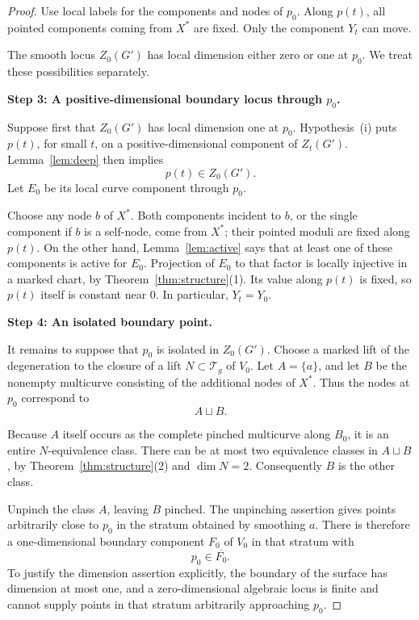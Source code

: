 \documentclass[11pt]{article}
\newcommand{\T}{\mathcal T}
\newcommand{\ol}[1]{\overline{#1}}
\theoremstyle{remark}
\begin{document}
\begin{proof}
Use local labels for the components and nodes of \(p_0\).
Along \(p(t)\), all pointed components coming from \(X^\ast\)
are fixed. Only the component \(Y_t\) can move.

The smooth locus \(Z_0(G')\) has local dimension either zero
or one at \(p_0\). We treat these possibilities separately.


\medskip
\noindent\textbf{Step 3: A positive-dimensional boundary locus
through \(p_0\).}

Suppose first that \(Z_0(G')\) has local dimension one at
\(p_0\). Hypothesis~(i) puts \(p(t)\), for small \(t\), on a
positive-dimensional component of \(Z_t(G')\).
Lemma~\ref{lem:deep} then implies
\[
p(t)\in Z_0(G').
\]
Let \(E_0\) be its local curve component through \(p_0\).

Choose any node \(b\) of \(X^\ast\). Both components incident
to \(b\), or the single component if \(b\) is a self-node,
come from \(X^\ast\); their pointed moduli are fixed along
\(p(t)\). On the other hand, Lemma~\ref{lem:active} says that
at least one of these components is active for \(E_0\).
Projection of \(E_0\) to that factor is locally injective in
a marked chart, by Theorem~\ref{thm:structure}(1).
Its value along \(p(t)\) is fixed, so \(p(t)\) itself is
constant near \(0\). In particular, \(Y_t=Y_0\).

\medskip
\noindent\textbf{Step 4: An isolated boundary point.}

It remains to suppose that \(p_0\) is isolated in \(Z_0(G')\).
Choose a marked lift of the degeneration to the closure of
a lift \(N\subset\T_g\) of \(V_0\).
Let \(A=\{a\}\), and let \(B\) be the nonempty multicurve
consisting of the additional nodes of \(X^\ast\).
Thus the nodes at \(p_0\) correspond to
\[
A\sqcup B.
\]

Because \(A\) itself occurs as the complete pinched multicurve
along \(B_0\), it is an entire \(N\)-equivalence class.
There can be at most two equivalence classes in \(A\sqcup B\),
by Theorem~\ref{thm:structure}(2) and \(\dim N=2\).
Consequently \(B\) is the other class.

Unpinch the class \(A\), leaving \(B\) pinched.
The unpinching assertion gives points arbitrarily close to
\(p_0\) in the stratum obtained by smoothing \(a\).
There is therefore a one-dimensional boundary component
\(F_0\) of \(V_0\) in that stratum with
\[
p_0\in\ol{F_0}.
\]
To justify the dimension assertion explicitly, the boundary of
the surface has dimension at most one, and a zero-dimensional
algebraic locus is finite and cannot supply points in that
stratum arbitrarily approaching \(p_0\).



\end{proof}
\end{document}
